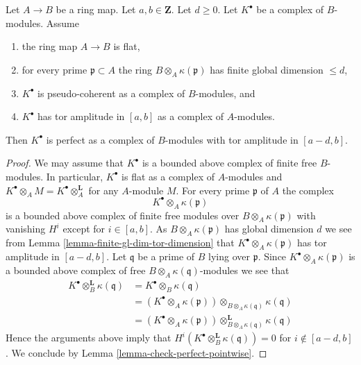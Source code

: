 \begin{lemma}
\label{lemma-perfect-over-polynomial-ring}
Let $A \to B$ be a ring map. Let $a, b \in \mathbf{Z}$. Let $d \geq 0$.
Let $K^\bullet$ be a complex of $B$-modules. Assume
\begin{enumerate}
\item the ring map $A \to B$ is flat,
\item for every prime $\mathfrak p \subset A$ the ring
$B \otimes_A \kappa(\mathfrak p)$ has finite global dimension $\leq d$,
\item $K^\bullet$ is pseudo-coherent as a complex of $B$-modules, and
\item $K^\bullet$ has tor amplitude in $[a, b]$ as a complex
of $A$-modules.
\end{enumerate}
Then $K^\bullet$ is perfect as a complex of $B$-modules
with tor amplitude in $[a - d, b]$.
\end{lemma}

\begin{proof}
We may assume that $K^\bullet$ is a bounded above complex of
finite free $B$-modules. In particular, $K^\bullet$ is flat as a
complex of $A$-modules and
$K^\bullet \otimes_A M = K^\bullet \otimes_A^{\mathbf{L}}$ for any
$A$-module $M$. For every prime $\mathfrak p$ of $A$ the complex
$$
K^\bullet \otimes_A \kappa(\mathfrak p)
$$
is a bounded above complex of finite free modules over
$B \otimes_A \kappa(\mathfrak p)$ with vanishing $H^i$ except
for $i \in [a, b]$. As $B \otimes_A \kappa(\mathfrak p)$
has global dimension $d$ we see from
Lemma \ref{lemma-finite-gl-dim-tor-dimension}
that $K^\bullet \otimes_A \kappa(\mathfrak p)$ has tor amplitude in
$[a - d, b]$. Let $\mathfrak q$ be a prime of $B$ lying over $\mathfrak p$.
Since $K^\bullet \otimes_A \kappa(\mathfrak p)$ is a bounded above
complex of free $B \otimes_A \kappa(\mathfrak q)$-modules we see
that
\begin{align*}
K^\bullet \otimes_B^{\mathbf{L}} \kappa(\mathfrak q)
& = K^\bullet \otimes_B \kappa(\mathfrak q) \\
& = (K^\bullet \otimes_A \kappa(\mathfrak p))
\otimes_{B \otimes_A \kappa(\mathfrak q)} \kappa(\mathfrak q) \\
& = (K^\bullet \otimes_A \kappa(\mathfrak p))
\otimes^{\mathbf{L}}_{B \otimes_A \kappa(\mathfrak q)} \kappa(\mathfrak q)
\end{align*}
Hence the arguments above imply that
$H^i(K^\bullet \otimes_B^{\mathbf{L}} \kappa(\mathfrak q)) = 0$
for $i \not \in [a - d, b]$. We conclude by
Lemma \ref{lemma-check-perfect-pointwise}.
\end{proof}

